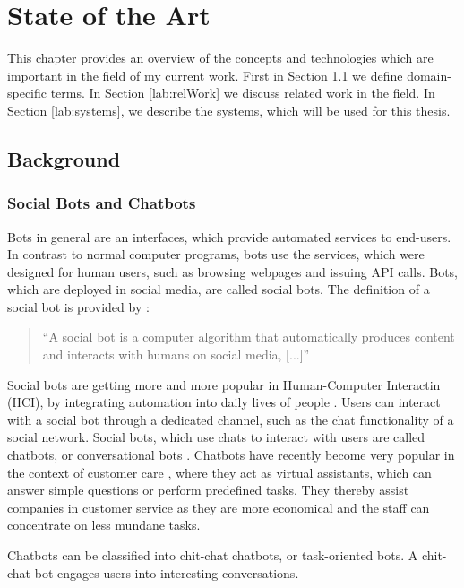 \chapter{State of the Art}
This chapter provides an overview of the concepts and technologies which are important in the field of my current work. First in Section \ref{lab:background} we define domain-specific terms. In Section \ref{lab:relWork} we discuss related work in the field.
In Section \ref{lab:systems}, we describe the systems, which will be used for this thesis.

\section{Background} \label{lab:background}

\subsection{Social Bots and Chatbots}
Bots in general are an interfaces, which provide automated services to end-users. In contrast to normal computer programs, bots use the services, which were designed for human users, such as browsing webpages and issuing API calls. Bots, which are deployed in social media, are called social bots. The definition of a social bot is provided by \cite{FVD*16b}:
\begin{quote}
	``A social bot is a computer algorithm that automatically produces content and interacts with humans on social media, [...]''
\end{quote}

Social bots are getting more and more popular in Human-Computer Interactin (HCI), by integrating automation into daily lives of people \cite{BFPN17}. Users can interact with a social bot through a dedicated channel, such as the chat functionality of a social network. Social bots, which use chats to interact with users are called chatbots, or conversational bots \cite{WWX*16}. Chatbots have recently become very popular in the context of customer care \cite{CHW*17,FVD*16b}, where they act as virtual assistants, which can answer simple questions \cite{CaWh14} or perform predefined tasks. They thereby assist companies in customer service as they are more economical and the staff can concentrate on less mundane tasks.

Chatbots can be classified into chit-chat chatbots, or task-oriented bots. A chit-chat bot engages users into interesting conversations.

